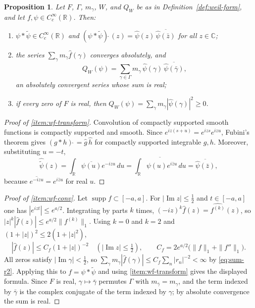 \documentclass[11pt]{amsart}
\theoremstyle{plain}
\newtheorem{proposition}[theorem]{Proposition}
\theoremstyle{definition}
\theoremstyle{remark}
\numberwithin{equation}{section}
\newcommand{\C}{\mathbb{C}}
\newcommand{\R}{\mathbb{R}}
\DeclareMathOperator{\Ima}{Im}
\renewcommand{\Im}{\Ima}
\begin{document}
\begin{proposition}\label{prop:weil-form}
Let $F$, $\Gamma$, $m_\gamma$, $W$, and $Q_W$ be as in
Definition~\ref{def:weil-form}, and let $f,\psi\in C_c^\infty(\R)$.
Then:
\begin{enumerate}[label=(\roman*)]
\item\label{item:wf-transform} $\psi*\widetilde\psi\in C_c^\infty(\R)$
  and $(\psi*\widetilde\psi)\widehat{\ }(z)
  =\widehat\psi(z)\,\overline{\widehat\psi(\bar z)}$ for all $z\in\C$;
\item\label{item:wf-conv} the series
  $\sum_{\gamma}m_\gamma\widehat f(\gamma)$ converges absolutely, and
  \[
  Q_W(\psi)=\sum_{\gamma\in\Gamma}m_\gamma\,\widehat\psi(\gamma)\,
    \overline{\widehat\psi(\bar\gamma)},
  \]
  an absolutely convergent series whose sum is real;
\item\label{item:wf-rh} if every zero of $F$ is real, then
  $Q_W(\psi)=\sum_{\gamma}m_\gamma|\widehat\psi(\gamma)|^2\ge0$.
\end{enumerate}
\end{proposition}

\begin{proof}[Proof of \ref{item:wf-transform}]
Convolution of compactly supported smooth functions is compactly
supported and smooth. Since $e^{iz(s+u)}=e^{izs}e^{izu}$, Fubini's
theorem gives $(g*h)\widehat{\ }=\widehat g\,\widehat h$ for compactly
supported integrable $g,h$. Moreover, substituting $u=-t$,
\[
\widehat{\widetilde\psi}(z)=\int_\R\overline{\psi(u)}e^{-izu}\,du
=\overline{\int_\R\psi(u)e^{i\bar zu}\,du}
=\overline{\widehat\psi(\bar z)},
\]
because $\overline{e^{-izu}}=e^{i\bar zu}$ for real $u$.
\end{proof}

\begin{proof}[Proof of \ref{item:wf-conv}]
Let $\operatorname{supp}f\subset[-a,a]$. For $|\Im z|\le\tfrac12$ and
$t\in[-a,a]$ one has $|e^{izt}|\le e^{a/2}$. Integrating by parts $k$
times, $(-iz)^k\widehat f(z)=\widehat{f^{(k)}}(z)$, so
$|z|^k|\widehat f(z)|\le e^{a/2}\|f^{(k)}\|_1$. Using $k=0$ and $k=2$
and $(1+|z|)^2\le2(1+|z|^2)$,
\[
|\widehat f(z)|\le C_f(1+|z|)^{-2}\quad(|\Im z|\le\tfrac12),\qquad
C_f=2e^{a/2}\bigl(\|f\|_1+\|f''\|_1\bigr).
\]
All zeros satisfy $|\Im\gamma|<\tfrac12$, so
$\sum_\gamma m_\gamma|\widehat f(\gamma)|\le C_f\sum_n|r_n|^{-2}<\infty$
by \eqref{eq:sum-r2}. Applying this to
$f=\psi*\widetilde\psi$ and using \ref{item:wf-transform} gives the
displayed formula. Since $F$ is real, $\gamma\mapsto\bar\gamma$ permutes
$\Gamma$ with $m_{\bar\gamma}=m_\gamma$, and the term indexed by
$\bar\gamma$ is the complex conjugate of the term indexed by $\gamma$;
by absolute convergence the sum is real.
\end{proof}
\end{document}
